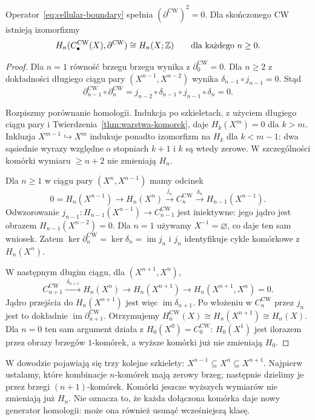 \begin{twierdzenie}
\label{thm:komorkowa-singularna}
Operator~\eqref{eq:cellular-boundary}
spełnia $(\partial^{\mathrm{CW}})^2=0$.
Dla skończonego CW istnieją
izomorfizmy
\[
 H_n(C_\bullet^{\mathrm{CW}}(X),
       \partial^{\mathrm{CW}})
 \cong H_n(X;\mathbb{Z})
 \qquad\text{dla każdego }n\geq0.
\]
\end{twierdzenie}
\begin{proof}
Dla $n=1$ równość brzegu brzegu wynika z $\partial_0^{\mathrm{CW}}=0$.
Dla $n\geq2$ z dokładności długiego ciągu
pary $(X^{n-1},X^{n-2})$
wynika $\delta_{n-1}\circ j_{n-1}=0$.
Stąd
\[
 \partial^{\mathrm{CW}}_{n-1}\circ
 \partial^{\mathrm{CW}}_n
 =j_{n-2}\circ\delta_{n-1}\circ j_{n-1}\circ\delta_n=0.
\]

Rozpiszmy porównanie homologii.
Indukcja po szkieletach,
z użyciem długiego ciągu pary
i Twierdzenia~\ref{thm:warstwa-komorek},
daje $H_k(X^m)=0$ dla $k>m$.
Inkluzja $X^{m-1}\hookrightarrow X^m$
indukuje ponadto izomorfizm na
$H_k$ dla $k<m-1$: dwa sąsiednie
wyrazy względne o stopniach
$k+1$ i $k$ są wtedy zerowe.
W szczególności komórki wymiaru
$\geq n+2$ nie zmieniają $H_n$.

Dla $n\geq1$ w ciągu pary
$(X^n,X^{n-1})$ mamy odcinek
\[
 0=H_n(X^{n-1})\longrightarrow
 H_n(X^n)\xrightarrow{\ j_n\ }
 C_n^{\mathrm{CW}}
 \xrightarrow{\ \delta_n\ }
 H_{n-1}(X^{n-1}).
\]
Odwzorowanie $j_{n-1}:H_{n-1}(X^{n-1})
\to C_{n-1}^{\mathrm{CW}}$
jest iniektywne: jego jądro
jest obrazem
$H_{n-1}(X^{n-2})=0$.
Dla $n=1$ używamy
$X^{-1}=\varnothing$, co daje
ten sam wniosek.
Zatem $\ker\partial_n^{\mathrm{CW}}
=\ker\delta_n=\operatorname{im}j_n$
i $j_n$ identyfikuje cykle
komórkowe z $H_n(X^n)$.

W następnym długim ciągu,
dla $(X^{n+1},X^n)$,
\[
 C_{n+1}^{\mathrm{CW}}
 \xrightarrow{\ \delta_{n+1}\ }
 H_n(X^n)\longrightarrow
 H_n(X^{n+1})\longrightarrow
 H_n(X^{n+1},X^n)=0.
\]
Jądro przejścia do $H_n(X^{n+1})$
jest więc $\operatorname{im}\delta_{n+1}$.
Po włożeniu w $C_n^{\mathrm{CW}}$
przez $j_n$ jest to dokładnie
$\operatorname{im}\partial_{n+1}^{\mathrm{CW}}$.
Otrzymujemy
$H_n^{\mathrm{CW}}(X)\cong
H_n(X^{n+1})\cong H_n(X)$.
Dla $n=0$ ten sam argument działa
z $H_0(X^0)=C_0^{\mathrm{CW}}$:
$H_0(X^1)$ jest ilorazem przez
obrazy brzegów $1$-komórek,
a wyższe komórki już nie
zmieniają $H_0$.
\end{proof}

W dowodzie pojawiają się trzy kolejne szkielety:
$X^{n-1}\subseteq X^n\subseteq X^{n+1}$.
Najpierw ustalamy, które kombinacje $n$-komórek mają zerowy brzeg;
następnie dzielimy je przez brzegi $(n+1)$-komórek.
Komórki jeszcze wyższych wymiarów nie zmieniają już $H_n$.
Nie oznacza to, że każda dołączona komórka daje nowy generator
homologii: może ona również usunąć wcześniejszą klasę.

